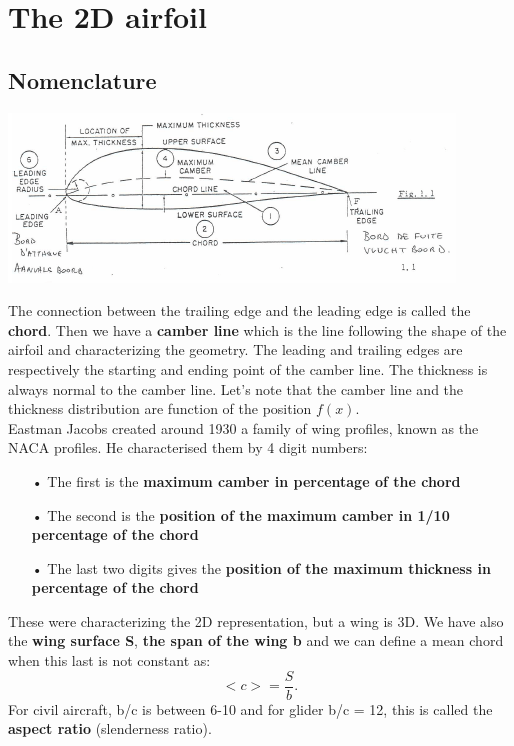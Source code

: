 
\chapter{The 2D airfoil}
	\section{Nomenclature}
		
		\begin{center}
		\includegraphics[scale=0.8]{ch2/1}
		\end{center}
		
		The connection between the trailing edge and the leading edge is called the \textbf{chord}. Then we have a \textbf{camber line} which is the line following the shape of the airfoil and characterizing the geometry. The leading and trailing edges are respectively the starting and ending point of the camber line. The thickness is always normal to the camber line. Let's note that the camber line and the thickness distribution are function of the position $f(x)$. \\
		
		Eastman Jacobs created around 1930 a family of wing profiles, known as the NACA profiles. He characterised them by 4 digit numbers: 
		
		\begin{itemize}
			\item[•] The first is the \textbf{maximum camber in percentage of the chord} 
			\item[•] The second is the \textbf{position of the maximum camber in 1/10 percentage of the chord}
			\item[•] The last two digits gives the \textbf{position of the maximum thickness in percentage of the chord}\\
		\end{itemize}				
		
		These were characterizing the 2D representation, but a wing is 3D. We have also the \textbf{wing surface S}, \textbf{the span of the wing b} and we can define a mean chord when this last is not constant as: 
		\begin{equation}
		<c> = \frac{S}{b}.
		\end{equation}				
		 For civil aircraft, b/c is between 6-10 and for glider b/c = 12, this is called the \textbf{aspect ratio} (slenderness ratio). 
		 
